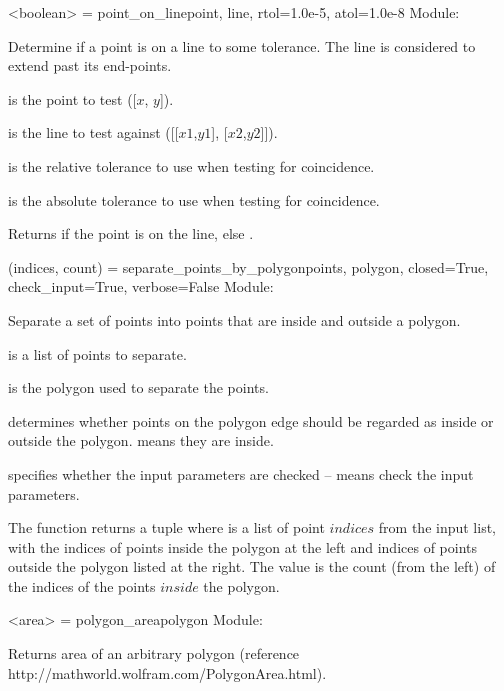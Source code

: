 \documentclass{manual}
\begin{document}
\label{ref:function_point_on_line}
\begin{funcdesc}{<boolean> = point_on_line}{point, line, rtol=1.0e-5, atol=1.0e-8}
Module: 

Determine if a point is on a line to some tolerance.  The line is considered to
extend past its end-points.

 is the point to test ([$x$, $y$]).

 is the line to test  against ([[$x1$,$y1$], [$x2$,$y2$]]).

 is the relative tolerance to use when testing for coincidence.

 is the absolute tolerance to use when testing for coincidence.

Returns  if the point is on the line, else .
\end{funcdesc}

\label{ref:function_separate_points_by_polygon}
\begin{funcdesc}{(indices, count) = separate_points_by_polygon}{points, polygon,
                                             closed=True,
                                             check_input=True,
                                             verbose=False}
Module: 

Separate a set of points into points that are inside and outside a polygon.

 is a list of points to separate.

 is the polygon used to separate the points.

 determines whether points on the polygon edge should be
regarded as inside or outside the polygon.   means they are inside.

 specifies whether the input parameters are checked -- 
means check the input parameters.

The function returns a tuple  where  is a list of
point $indices$ from the input  list, with the indices of points inside the
polygon at the left and indices of points outside the polygon listed at the right.  The
 value is the count (from the left) of the indices of the points $inside$ the
polygon.
\end{funcdesc}

\begin{funcdesc}{<area> = polygon_area}{polygon}
Module: 

Returns area of an arbitrary polygon (reference http://mathworld.wolfram.com/PolygonArea.html).
\end{funcdesc}
\end{document}
